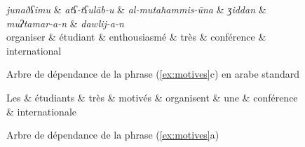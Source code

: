 {    
\begin{figure}[H]
     \caption{Arbre de dépendance de la phrase (\ref{ex:motives}c) en arabe standard\label{fig:motives-arabe}}
  \begin{dependency}[font=\footnotesize,arc edge, arc angle=80, text only label, label style={above}]
    \begin{deptext}
    \textit{junaðʕimu} \& \textit{atʕ-tʕul\=ab-u} \& \textit{al-mutaħammis-\=una} \& \textit{ʒiddan} \& \textit{muʔtamar-a-n} \& \textit{dawlij-a-n}\\
   organiser  \& étudiant \& enthousiasmé \& très \& conférence \& international\\
    \end{deptext}
    \end{dependency}
\end{figure}

    
    \begin{figure}[H]
    \caption{Arbre de dépendance de la phrase (\ref{ex:motives}a)}
    \begin{dependency}[font=\normalfont\itshape,arc edge, arc angle=80, text only label, label style={above}]
    \begin{deptext}
    Les \& étudiants \& très \& motivés \& organisent \& une \& conférence \& internationale\\
    \end{deptext}
    \end{dependency}    
\label{fig:motives-francais}
\end{figure}
}%
